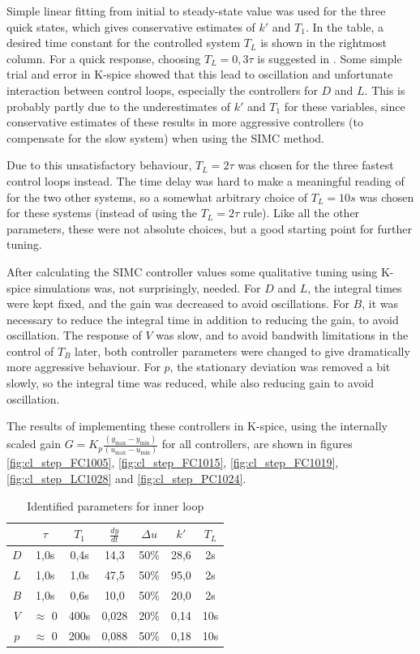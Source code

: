 \documentclass[12pt]{article}
\begin{document}
Simple linear fitting from initial to steady-state value was used for the three quick states, which gives conservative estimates of $k'$ and $T_1$. In the table, a desired time constant for the controlled system $T_L$ is shown in the rightmost column. For a quick response, choosing $T_L = 0,3\tau$ is suggested in \cite{balchen}. Some simple trial and error in K-spice showed that this lead to oscillation and unfortunate interaction between control loops, especially the controllers for $D$ and $L$. This is probably partly due to the underestimates of $k'$ and $T_1$ for these variables, since conservative estimates of these results in more aggressive controllers (to compensate for the slow system) when using the SIMC method.

Due to this unsatisfactory behaviour, $T_L = 2\tau$ was chosen for the three fastest control loops instead. The time delay was hard to make a meaningful reading of for the two other systems, so a somewhat arbitrary choice of $T_L = 10s$ was chosen for these systems (instead of using the $T_L = 2\tau$ rule). Like all the other parameters, these were not absolute choices, but a good starting point for further tuning.

After calculating the SIMC controller values some qualitative tuning using K-spice simulations was, not surprisingly, needed. For $D$ and $L$, the integral times were kept fixed, and the gain was decreased to avoid oscillations. For $B$, it was necessary to reduce the integral time in addition to reducing the gain, to avoid oscillation. The response of $V$ was slow, and to avoid bandwith limitations in the control of $T_B$ later, both controller parameters were changed to give dramatically more aggressive behaviour. For $p$, the stationary deviation was removed a bit slowly, so the integral time was reduced, while also reducing gain to avoid oscillation.


The results of implementing these controllers in K-spice, using the internally scaled gain $G = K_p \frac{(y_{\max} - y_{\min})}{(u_{\max} - u_{\min})}$ for all controllers, are shown in figures \ref{fig:cl_step_FC1005}, \ref{fig:cl_step_FC1015}, \ref{fig:cl_step_FC1019}, \ref{fig:cl_step_LC1028} and \ref{fig:cl_step_PC1024}.


\begin{table}
\centering
\begin{tabular}{c | c | c | c | c | c || c}
& $\tau$ & $T_1$ & $\frac{dy}{dt}$ & $\Delta u$ & $k'$ & $T_L$ \\ \hline
$D$ & 1,0s & 0,4s & 14,3 & 50\% & 28,6 & 2s \\
$L$ & 1,0s & 1,0s & 47,5 & 50\% & 95,0 & 2s \\
$B$ & 1,0s & 0,6s & 10,0 & 50\% & 20,0 & 2s \\
$V$ & $\approx$ 0 & 400s & 0,028 & 20\% & 0,14 & 10s \\
$p$ & $\approx$ 0 & 200s & 0,088 & 50\% & 0,18 & 10s
\end{tabular}
\caption{Identified parameters for inner loop}
\label{tab:inner_loop_step_responses}
\end{table}
\end{document}
